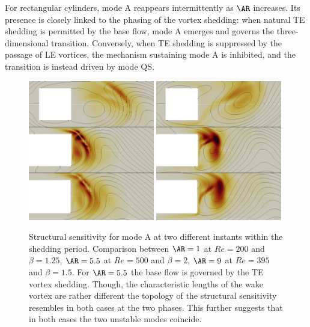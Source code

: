 For rectangular cylinders, mode A reappears intermittently as $\AR$ increases. Its presence is closely linked to the phasing of the vortex shedding: when natural TE shedding is permitted by the base flow, mode A emerges and governs the three-dimensional transition. Conversely, when TE shedding is suppressed by the passage of LE vortices, the mechanism sustaining mode A is inhibited, and the transition is instead driven by mode QS.

\begin{figure}
  \centering
  \includegraphics[width=0.49\textwidth]{./fig/AR5p5/sens_1-200-1p25_5p5-500-2_9-395_1p5_modeA_75.png}
  \includegraphics[width=0.49\textwidth]{./fig/AR5p5/sens_1-200-1p25_5p5-500-2_9-395_1p5_modeA_100.png}
  \caption{Structural sensitivity for mode A at two different instants within the shedding period. Comparison between $\AR=1$ at $Re=200$ and $\beta=1.25$, $\AR=5.5$ at $Re=500$ and $\beta=2$, $\AR=9$ at $Re=395$ and $\beta=1.5$. For $\AR=5.5$ the base flow is governed by the TE vortex shedding. Though, the characteristic lengths of the wake vortex are rather different the topology of the structural sensitivity resembles in both cases at the two phases. This further suggests that in both cases the two unstable modes coincide.}
  \label{fig:sens_modeA}
\end{figure}
